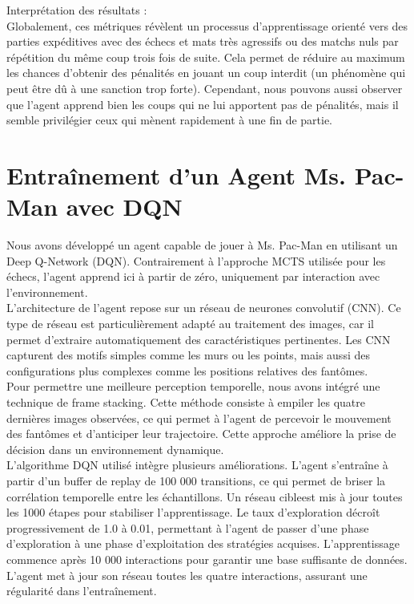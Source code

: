 \documentclass{article}
\begin{document}
    Interprétation des résultats :\\

    Globalement, ces métriques révèlent un processus d'apprentissage orienté vers des parties expéditives avec des échecs et mats très agressifs ou des matchs nuls par répétition du même coup trois fois de suite. Cela permet de réduire au maximum les chances d'obtenir des pénalités en jouant un coup interdit (un phénomène qui peut être dû à une sanction trop forte). Cependant, nous pouvons aussi observer que l'agent apprend bien les coups qui ne lui apportent pas de pénalités, mais il semble privilégier ceux qui mènent rapidement à une fin de partie.

\clearpage

\section{Entraînement d'un Agent Ms. Pac-Man avec DQN}

\quad Nous avons développé un agent capable de jouer à Ms. Pac-Man en utilisant un Deep Q-Network (DQN). Contrairement à l’approche MCTS utilisée pour les échecs, l’agent apprend ici à partir de zéro, uniquement par interaction avec l’environnement.\\

L’architecture de l’agent repose sur un réseau de neurones convolutif (CNN). Ce type de réseau est particulièrement adapté au traitement des images, car il permet d’extraire automatiquement des caractéristiques pertinentes. Les CNN capturent des motifs simples comme les murs ou les points, mais aussi des configurations plus complexes comme les positions relatives des fantômes.\\

Pour permettre une meilleure perception temporelle, nous avons intégré une technique de frame stacking. Cette méthode consiste à empiler les quatre dernières images observées, ce qui permet à l’agent de percevoir le mouvement des fantômes et d’anticiper leur trajectoire. Cette approche améliore la prise de décision dans un environnement dynamique.\\

L’algorithme DQN utilisé intègre plusieurs améliorations. L’agent s’entraîne à partir d’un buffer de replay de 100 000 transitions, ce qui permet de briser la corrélation temporelle entre les échantillons. Un réseau cibleest mis à jour toutes les 1000 étapes pour stabiliser l’apprentissage. Le taux d’exploration décroît progressivement de 1.0 à 0.01, permettant à l’agent de passer d’une phase d’exploration à une phase d’exploitation des stratégies acquises. L’apprentissage commence après 10 000 interactions pour garantir une base suffisante de données. L’agent met à jour son réseau toutes les quatre interactions, assurant une régularité dans l’entraînement.\\
\end{document}
